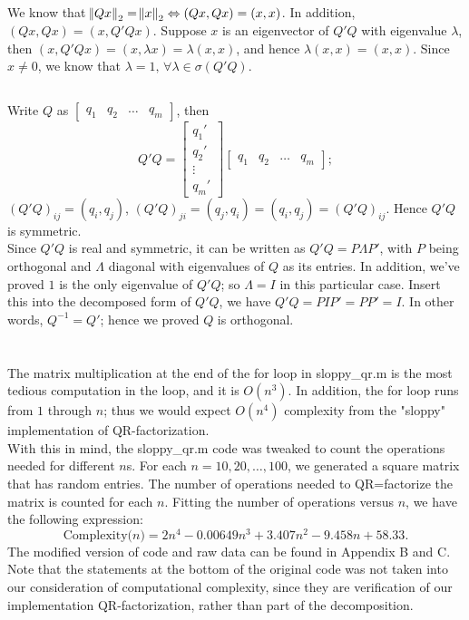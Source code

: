 \documentclass[11pt]{article}
\begin{document}
\section{}
\subsection{}
We know that $\norm{Qx}_2=\norm{x}_2\Leftrightarrow(Qx,Qx)=(x,x)$. In addition, $(Qx, Qx)=(x,Q'Qx)$. Suppose $x$ is an eigenvector of $Q'Q$ with eigenvalue $\lambda$, then $(x,Q'Qx)=(x,\lambda x)=\lambda(x,x)$, and hence $\lambda(x,x)=(x,x)$. Since $x\neq0$, we know that $\lambda=1,\,\forall\lambda\in\sigma(Q'Q)$.
\subsection{}
Write $Q$ as $\begin{bmatrix} q_1 & q_2 & \dots &q_m\end{bmatrix}$, then $$Q'Q=\begin{bmatrix} q_1'\\q_2'\\\vdots\\q_m'\end{bmatrix}\begin{bmatrix} q_1&q_2&\dots&q_m\end{bmatrix}; $$ $(Q'Q)_{ij}=(q_i,q_j)$, $(Q'Q)_{ji}=(q_j,q_i)=(q_i,q_j)=(Q'Q)_{ij}$. Hence $Q'Q$ is symmetric.\\[0.5cm]
Since $Q'Q$ is real and symmetric, it can be written as $Q'Q=P\Lambda P'$, with $P$ being orthogonal and $\Lambda$ diagonal with eigenvalues of $Q$ as its entries. In addition, we've proved $1$ is the only eigenvalue of $Q'Q$; so $\Lambda=I$ in this particular case. Insert this into the decomposed form of $Q'Q$, we have $Q'Q=PIP'=PP'=I$. In other words, $Q^{-1}=Q'$; hence we proved $Q$ is orthogonal.
\section{}
The matrix multiplication at the end of the for loop in sloppy\_qr.m is the most tedious computation in the loop, and it is $O(n^3)$. In addition, the for loop runs from $1$ through $n$; thus we would expect $O(n^4)$ complexity from the "sloppy" implementation of QR-factorization.\\[0.5cm] 
With this in mind, the sloppy\_qr.m code was tweaked to count the operations needed for different $n$s. For each $n=10,20,\dots,100$, we generated a square matrix that has random entries. The number of operations needed to QR=factorize the matrix is counted for each $n$. Fitting the number of operations versus $n$, we have the following expression: 
$$\mathrm{Complexity(}n\mathrm{)}=2n^4-0.00649n^3+3.407n^2-9.458n+58.33.$$
The modified version of code and raw data can be found in Appendix B and C. Note that the statements at the bottom of the original code was not taken into our consideration of computational complexity, since they are verification of our implementation QR-factorization, rather than part of the decomposition.
\end{document}
